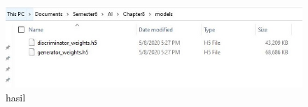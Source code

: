 \begin{enumerate}
\begin{figure}[H]
\centering
\includegraphics[scale=0.4]{figures/1174002/chapter8/h4.JPG}
\caption{hasil}
\label{Contoh}
\end{figure}



\end{enumerate}

